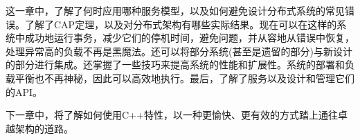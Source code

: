 这一章中，了解了何时应用哪种服务模型，以及如何避免设计分布式系统的常见错误。了解了CAP定理，以及对分布式架构有哪些实际结果。现在可以在这样的系统中成功地运行事务，减少它们的停机时间，避免问题，并从容地从错误中恢复，处理异常高的负载不再是黑魔法。还可以将部分系统(甚至是遗留的部分)与新设计的部分进行集成。还掌握了一些技巧来提高系统的性能和扩展性。系统的部署和负载平衡也不再神秘，因此可以高效地执行。最后，了解了服务以及设计和管理它们的API。

下一章中，将了解如何使用C++特性，以一种更愉快、更有效的方式踏上通往卓越架构的道路。
